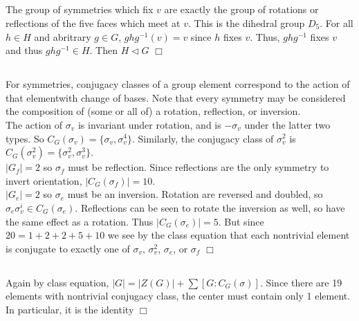 \documentclass{article}
\begin{document}
\subsection{}
The group of symmetries which fix $v$ are exactly the group of rotations or reflections of the five faces which meet at $v$. This is the dihedral group $D_5$. For all $h \in H$ and abritrary $g \in G$, $ghg^{-1}(v) = v$ since $h$ fixes $v$. Thus, $ghg^{-1}$ fixes $v$ and thus $ghg^{-1} \in H$. Then $H \lhd G$ $\Box$

\subsection{}
For symmetries, conjugacy classes of a group element correspond to the action of that elementwith change of bases. Note that every symmetry may be considered the composition of (some or all of) a rotation, reflection, or inversion.\\
The action of $\sigma_v$ is invariant under rotation, and is $-\sigma_v$ under the latter two types. So $C_G(\sigma_v) = \{\sigma_v, \sigma_v^4\}$. Similarly, the conjugacy class of $\sigma_v^2$ is $C_G(\sigma_v^2) = \{\sigma_v^2, \sigma_v^3\}$.\\
$|G_f| = 2$ so $\sigma_f$ must be reflection. Since reflections are the only symmetry to invert orientation, $|C_G(\sigma_f)| = 10$.\\
$|G_e| = 2$ so $\sigma_e$ must be an inversion. Rotation are reversed and doubled, so $\sigma_e\sigma_v^i \in C_G(\sigma_e)$. Reflections can be seen to rotate the inversion as well, so have the same effect as a rotation. Thus $|C_G(\sigma_e)| = 5$. But since $20 = 1 + 2 + 2 + 5 + 10$ we see by the class equation that each nontrivial element is conjugate to exactly one of $\sigma_v$, $\sigma_v^2$, $\sigma_e$, or $\sigma_f$ $\Box$

\subsection{}
Again by class equation, $|G| = |Z(G)| + \sum [G:C_G(\sigma)]$. Since there are 19 elements with nontrivial conjugacy class, the center must contain only 1 element. In particular, it is the identity $\Box$
\end{document}
